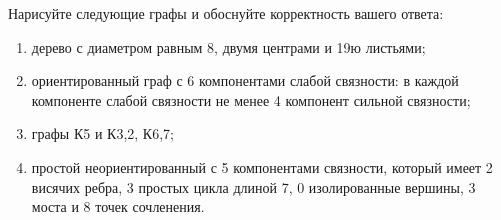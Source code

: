 \question 
Нарисуйте следующие графы и обоснуйте корректность вашего ответа:
\begin{enumerate}
\item  дерево с диаметром равным 8, двумя центрами  и  19ю листьями;
\item  ориентированный граф с 6 компонентами слабой связности: в  каждой компоненте слабой связности не менее 4 компонент сильной связности;
\item  графы К5 и К3,2, К6,7;
\item  простой неориентированный с 5 компонентами связности, который имеет 2 висячих ребра, 3 простых цикла длиной 7, 0 изолированные вершины, 3 моста и 8 точек сочленения.
\end{enumerate}